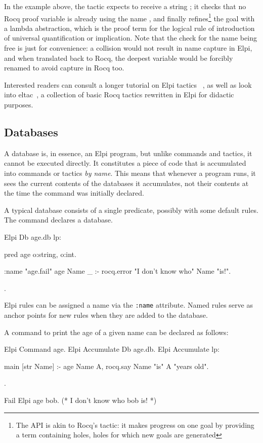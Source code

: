 \documentclass{these-ISSS}
\newenvironment{rocqcode}
  {\VerbatimEnvironment\begin{rocqbox}\begin{xrocqcode}}{\end{xrocqcode}
\end{rocqbox}}
\begin{document}
In the example above, the tactic expects to receive a string ; it
checks that no Rocq proof variable is already using the name , and finally
refines\footnote{The  API is akin to Rocq's 
tactic: it makes progress on one goal by
providing a term containing holes, holes for which new goals are generated}
the goal with a lambda abstraction, which is the proof term for the
logical rule of introduction of universal quantification or implication.
Note that the check for the name being free is just for convenience: a
collision would not result in name capture in Elpi, and when translated back
to Rocq, the deepest variable would be forcibly renamed to avoid capture in Rocq too.

Interested readers can consult a longer tutorial on Elpi tactics
~\cite{tuto:tactics}, as well as look into eltac~\cite{app:eltac},
a collection of basic Rocq tactics rewritten in Elpi for didactic purposes.

\subsection{Databases}\label{sec:homo}


A database is, in essence, an Elpi program, but unlike commands and tactics,
it cannot be executed directly. It constitutes a piece of code that is
accumulated into commands or tactics \emph{by name}. This means that whenever
a program runs, it sees the current contents of the databases it accumulates,
not their contents at the time the command was initially declared.


A typical database consists of a single predicate, possibly with some default
rules. The  command declares a database.

\begin{rocqcode}
Elpi Db age.db lp:{{
  pred age o:string, o:int.

  :name "age.fail"
  age Name _ :- rocq.error "I don't know who" Name "is!".
}}.
\end{rocqcode}


Elpi rules can be assigned a name via the \texttt{:name} attribute. Named rules
serve as anchor points for new rules when they are added to the database.


A command to print the age of a given name can be declared as follows:

\begin{rocqcode}
Elpi Command age.
Elpi Accumulate Db age.db.
Elpi Accumulate lp:{{

  main [str Name] :-
    age Name A,
    rocq.say Name "is" A "years old".

}}.

Fail Elpi age bob. (* I don't know who bob is! *)
\end{rocqcode}
\end{document}

